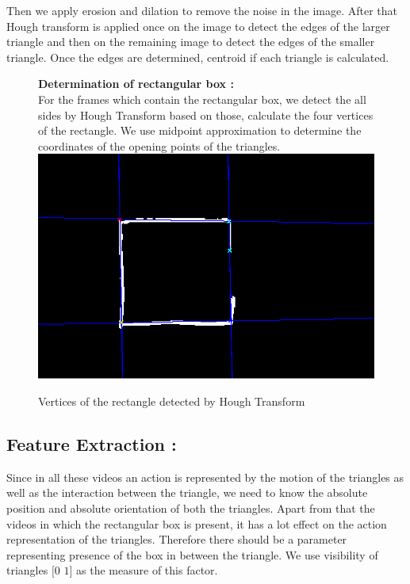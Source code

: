 \documentclass[11pt, twocolumn]{article}
\begin{document}
Then we apply erosion and dilation to remove the noise in the image. After that Hough transform is applied once on the image to detect the edges of the larger triangle and then on the remaining image to detect the edges of the smaller triangle. Once the edges are determined, centroid if each triangle is calculated.\\
\begin{figure}[H]
{\bf Determination of rectangular box :} \\
 \hspace*{10pt} For the frames which contain the rectangular box, we detect the all sides by Hough Transform based on those, calculate the four vertices of the rectangle. We use midpoint approximation to determine the coordinates of the opening points of the triangles. 
\center
\includegraphics[scale=0.3]{rectCoax.png}
\caption{Vertices of the rectangle detected by Hough Transform}
\end{figure}

\subsection*{Feature Extraction :}
\hspace*{10pt} Since in all these videos an action is represented by the motion of the triangles as well as the interaction between the triangle, we need to know the absolute position and absolute orientation of both the triangles. Apart from that the videos in which the rectangular box is present, it has a lot effect on the action representation of the triangles. Therefore there should be a parameter representing presence of the box in between the triangle. We use visibility of triangles $[0$ $1]$ as the measure of this factor.
\end{document}
